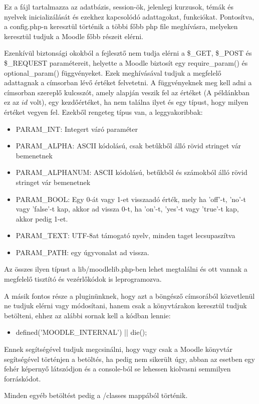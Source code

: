 Ez a fájl tartalmazza az adatbázis, session-ök, jelenlegi kurzusok, témák és nyelvek inicializálását és ezekhez kapcsolódó adattagokat, funkciókat. Pontosítva, a config.php-n keresztül történik a többi főbb php file meghívásra, melyeken keresztül tudjuk a Moodle főbb részeit elérni. \par

Ezenkívül biztonsági okokból a fejlesztő nem tudja elérni a \$\_GET,  \$\_POST és  \$\_REQUEST paramétereit, helyette a Moodle biztosít egy require\_param() és optional\_param() függvényeket. Ezek meghívásával tudjuk a megfelelő adattagnak a címsorban lévő értéket felvetetni. A függvényeknek meg kell adni a címsorban szereplő kulcsszót, amely alapján veszik fel az értéket (A példánkban ez az $id$ volt), egy kezdőértéket, ha nem találna ilyet és egy típust, hogy milyen értéket vegyen fel. Ezekből rengeteg típus van, a leggyakoribbak:

\begin{itemize}
    \item PARAM\_INT: Integert váró paraméter
    \item PARAM\_ALPHA: ASCII kódolású, csak betűkből álló rövid stringet vár bemenetnek
    \item PARAM\_ALPHANUM: ASCII kódolású, betűkből és számokból álló rövid stringet vár bemenetnek
    \item PARAM\_BOOL: Egy 0-át vagy 1-et visszaadó érték, mely ha 'off'-t, 'no'-t vagy 'false'-t kap, akkor ad vissza 0-t, ha 'on'-t, 'yes'-t vagy 'true'-t kap, akkor pedig 1-et.
    \item PARAM\_TEXT: UTF-8at támogató nyelv, minden taget lecsupaszítva
    \item PARAM\_PATH: egy úgyvonalat ad vissza.
\end{itemize}

Az összes ilyen típust a lib/moodlelib.php-ben lehet megtalálni és ott vannak a megfelelő tisztító és vezérlőkódok is leprogramozva.

A másik fontos része a pluginünknek, hogy azt a böngésző címsorából közvetlenül ne tudjuk elérni vagy módosítani, hanem csak a könyvtárakon keresztül tudjuk betölteni, ehhez az alábbi sornak kell a kódban lennie: \par
\begin{itemize}
    \item[] defined('MOODLE\_INTERNAL') || die();
\end{itemize}

Ennek segítségével tudjuk megcsinálni, hogy vagy csak a Moodle könyvtár segítségével történjen a betöltés, ha pedig nem sikerült úgy, abban az esetben egy fehér képernyő látszódjon és a console-ból se lehessen kiolvasni semmilyen forráskódot. \par
Minden egyéb betöltést pedig a /classes mappából történik. 


